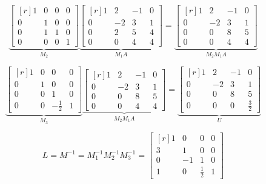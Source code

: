 \documentclass{jhwhw}
\begin{document}
\[
	\underbrace{\begin{bmatrix*}[r]
	  1     &    0    &     0   &  0 \\
	  0     &    1    &     0   &  0 \\
	  0     &    1    &     1   &  0 \\
	  0     &    0    &     0   &  1 
   \end{bmatrix*}}_{M_2}
   \underbrace{\begin{bmatrix*}[r]
	  1     &    2    &    -1   &  0 \\
	  0     &   -2    &     3   &  1 \\
	  0     &    2    &     5   &  4 \\
	  0     &    0    &     4   &  4 
	\end{bmatrix*}}_{M_1A}
	=
   \underbrace{\begin{bmatrix*}[r]
	  1     &    2    &    -1   &  0 \\
	  0     &   -2    &     3   &  1 \\
	  0     &    0    &     8   &  5 \\
	  0     &    0    &     4   &  4 
	\end{bmatrix*}}_{M_2M_1A}
\]

\[
	\underbrace{\begin{bmatrix*}[r]
	  1     &    0    &     0   &  0 \\
	  0     &    1    &     0   &  0 \\
	  0     &    0    &     1   &  0 \\
	  0     &    0    & -\frac{1}{2} &  1 
   \end{bmatrix*}}_{M_3}
   \underbrace{\begin{bmatrix*}[r]
	  1     &    2    &    -1   &  0 \\
	  0     &   -2    &     3   &  1 \\
	  0     &    0    &     8   &  5 \\
	  0     &    0    &     4   &  4 
	\end{bmatrix*}}_{M_2M_1A}
	=
   \underbrace{\begin{bmatrix*}[r]
	  1     &    2    &    -1   &  0 \\
	  0     &   -2    &     3   &  1 \\
	  0     &    0    &     8   &  5 \\
	  0     &    0    &     0   &  \frac{3}{2} 
	\end{bmatrix*}}_{U}
\]

\[
	L = M^{-1} = M_1^{-1} M_2^{-1} M_3^{-1}
	=
	\begin{bmatrix*}[r]
	  1     &    0    &     0   &  0 \\
	  3     &    1    &     0   &  0 \\
	  0     &   -1    &     1   &  0 \\
	  1     &    0    &  \frac{1}{2}  & 1
	\end{bmatrix*}
\]
\end{document}
